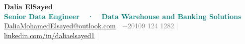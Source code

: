 \begin{center}
  {\fontsize{28}{32}\selectfont\textbf{\textcolor{darktext}{Dalia ElSayed}}}\\[4pt]
  {\normalsize\textbf{\textcolor{teal}{%
    Senior Data Engineer\ \ ·\ \ Data Warehouse and Banking Solutions\ %
  }}}\\[6pt]
  {\small
    \textcolor{lightgray}{\faEnvelope}\enspace
    \href{mailto:DaliaMohamedElsayed@outlook.com}{DaliaMohamedElsayed@outlook.com}
    \quad\textcolor{lightgray}{|}\quad
    \textcolor{lightgray}{\faPhone}\enspace
    \textcolor{graytext}{+20109 124 1282}
    \quad\textcolor{lightgray}{|}\quad
    \textcolor{lightgray}{\faLinkedin}\enspace
    \href{https://www.linkedin.com/in/daliaelsayed1}{linkedin.com/in/daliaelsayed1}
    \quad\textcolor{lightgray}{|}\quad
  }
\end{center}
\vspace{2pt}
